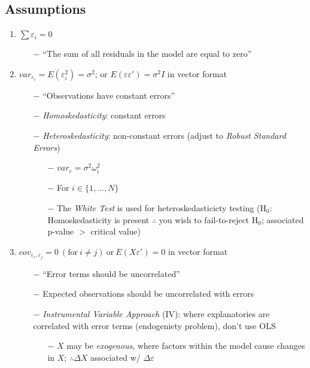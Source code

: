 \documentclass[11pt, english]{article}
\begin{document}
	\newpage

	\subsection{Assumptions}	

	\begin{enumerate}
	\setlength\itemsep{0cm}
		\item $\sum\varepsilon_i=0$
		\begin{enumerate}
			\item[$-$] ``The sum of all residuals in the model are equal to zero''
		\end{enumerate}
		\item $var_{\varepsilon_i}=E(\varepsilon_i^2)=\sigma^2$; or $E(\varepsilon\varepsilon')=\sigma^2I$ in vector format
		\begin{enumerate}
			\item[$-$] ``Observations have constant errors''
			\item[$-$] \textit{Homoskedasticity}: constant errors
			\item[$-$] \textit{Heteroskedasticity}: non-constant errors (adjust to \textit{Robust Standard Errors})
			\begin{enumerate}
				\item[$-$] $var_{\varepsilon}=\sigma^2\omega_i^2$
				\item[$-$] For $i\in\{1,...,N\}$
				\item[$-$] The \textit{White Test} is used for heteroskedasticicty testing (H$_0$: Homoskedasticity is present $\therefore$ you wish to fail-to-reject H$_0$; associated p-value $>$ critical value)
			\end{enumerate}
		\end{enumerate}
		\item $cov_{\varepsilon_i,\varepsilon_j}=0\ (\mathrm{for}\ i\neq j)\ \mathrm{or}\ E(X\varepsilon')=0$ in vector format
		\begin{enumerate}
			\item[$-$] ``Error terms should be uncorrelated''
			\item[$-$] Expected observations should be uncorrelated with errors
			\item[$-$] \textit{Instrumental Variable Approach} (IV): where explanatories are correlated with error terms (endogeniety problem), don't use OLS
			\begin{enumerate}
				\item[$-$] $X$ may be \textit{exogenous}, where factors within the model cause changes in $X$; $\therefore\Delta X$ associated w/ $\Delta\varepsilon$

\end{enumerate}
\end{enumerate}
\end{enumerate}
\end{document}
